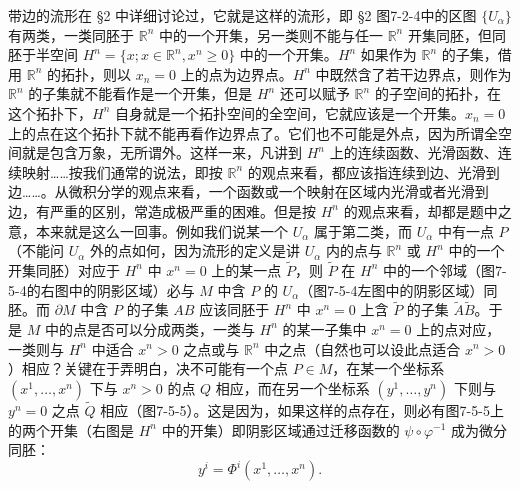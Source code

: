 带边的流形在 §2 中详细讨论过，它就是这样的流形，即 §2 图7-2-4中的区图 $\{U_\alpha\}$ 有两类，一类同胚于 $\mathbb R^n$ 中的一个开集，另一类则不能与任一 $\mathbb R^n$ 开集同胚，但同胚于半空间 $H^n=\{x;x\in\mathbb R^n,x^n\ge0\}$ 中的一个开集。$H^n$ 如果作为 $\mathbb R^n$ 的子集，借用 $\mathbb R^n$ 的拓扑，则以 $x_n=0$ 上的点为边界点。$H^n$ 中既然含了若干边界点，则作为 $\mathbb R^n$ 的子集就不能看作是一个开集，但是 $H^n$ 还可以赋予 $\mathbb R^n$ 的子空间的拓扑，在这个拓扑下，$H^n$ 自身就是一个拓扑空间的全空间，它就应该是一个开集。$x_n=0$ 上的点在这个拓扑下就不能再看作边界点了。它们也不可能是外点，因为所谓全空间就是包含万象，无所谓外。这样一来，凡讲到 $H^n$ 上的连续函数、光滑函数、连续映射……按我们通常的说法，即按 $\mathbb R^n$ 的观点来看，都应该指连续到边、光滑到边……。从微积分学的观点来看，一个函数或一个映射在区域内光滑或者光滑到边，有严重的区别，常造成极严重的困难。但是按 $H^n$ 的观点来看，却都是题中之意，本来就是这么一回事。例如我们说某一个 $U_\alpha$ 属于第二类，而 $U_\alpha$ 中有一点 $P$（不能问 $U_\alpha$ 外的点如何，因为流形的定义是讲 $U_\alpha$ 内的点与 $\mathbb R^n$ 或 $H^n$ 中的一个开集同胚）对应于 $H^n$ 中 $x^n=0$ 上的某一点 $\widetilde P$，则 $\widetilde P$ 在 $H^n$ 中的一个邻域（图7-5-4的右图中的阴影区域）必与 $M$ 中含 $P$ 的 $U_\alpha$（图7-5-4左图中的阴影区域）同胚。而 $\partial M$ 中含 $P$ 的子集 $AB$ 应该同胚于 $H^n$ 中 $x^n=0$ 上含 $\widetilde P$ 的子集 $\widetilde A\widetilde B$。于是 $M$ 中的点是否可以分成两类，一类与 $H^n$ 的某一子集中 $x^n=0$ 上的点对应，一类则与 $H^n$ 中适合 $x^n>0$ 之点或与 $\mathbb R^n$ 中之点（自然也可以设此点适合 $x^n>0$）相应？关键在于弄明白，决不可能有一个点 $P\in M$，在某一个坐标系 $(x^1,\ldots,x^n)$ 下与 $x^n>0$ 的点 $Q$ 相应，而在另一个坐标系 $(y^1,\ldots,y^n)$ 下则与 $y^n=0$ 之点 $\widetilde Q$ 相应（图7-5-5）。这是因为，如果这样的点存在，则必有图7-5-5上的两个开集（右图是 $H^n$ 中的开集）即阴影区域通过迁移函数的 $\psi\circ\varphi^{-1}$ 成为微分同胚：
\begin{equation}
 y^i=\Phi^i(x^1,\ldots,x^n).
 \tag{27}
\end{equation}

